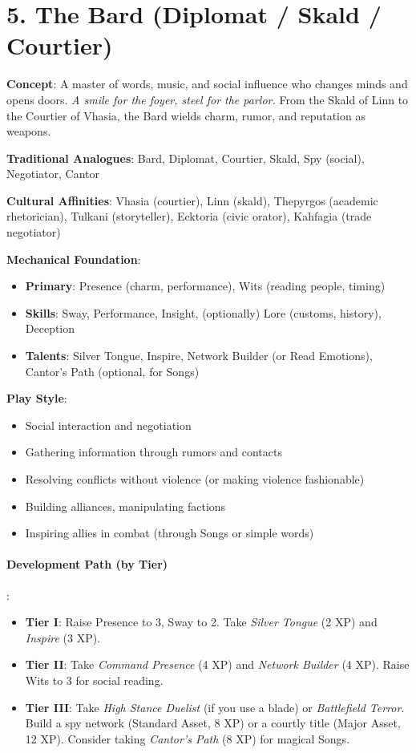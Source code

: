 \section{5. The Bard (Diplomat / Skald / Courtier)}
\label{sec:concept-bard}

\textbf{Concept}: A master of words, music, and social influence who changes minds and opens doors. \emph{A smile for the foyer, steel for the parlor.} From the Skald of Linn to the Courtier of Vhasia, the Bard wields charm, rumor, and reputation as weapons.

\textbf{Traditional Analogues}: Bard, Diplomat, Courtier, Skald, Spy (social), Negotiator, Cantor

\textbf{Cultural Affinities}: Vhasia (courtier), Linn (skald), Thepyrgos (academic rhetorician), Tulkani (storyteller), Ecktoria (civic orator), Kahfagia (trade negotiator)

\textbf{Mechanical Foundation}:
\begin{itemize}
\item \textbf{Primary}: Presence (charm, performance), Wits (reading people, timing)
\item \textbf{Skills}: Sway, Performance, Insight, (optionally) Lore (customs, history), Deception
\item \textbf{Talents}: Silver Tongue, Inspire, Network Builder (or Read Emotions), Cantor's Path (optional, for Songs)
\end{itemize}

\textbf{Play Style}:
\begin{itemize}
\item Social interaction and negotiation
\item Gathering information through rumors and contacts
\item Resolving conflicts without violence (or making violence fashionable)
\item Building alliances, manipulating factions
\item Inspiring allies in combat (through Songs or simple words)
\end{itemize}

\paragraph{Development Path (by Tier)}:
\begin{itemize}
\item \textbf{Tier I}: Raise Presence to 3, Sway to 2. Take \emph{Silver Tongue} (2 XP) and \emph{Inspire} (3 XP).
\item \textbf{Tier II}: Take \emph{Command Presence} (4 XP) and \emph{Network Builder} (4 XP). Raise Wits to 3 for social reading.
\item \textbf{Tier III}: Take \emph{High Stance Duelist} (if you use a blade) or \emph{Battlefield Terror}. Build a spy network (Standard Asset, 8 XP) or a courtly title (Major Asset, 12 XP). Consider taking \emph{Cantor's Path} (8 XP) for magical Songs.
\end{itemize}

